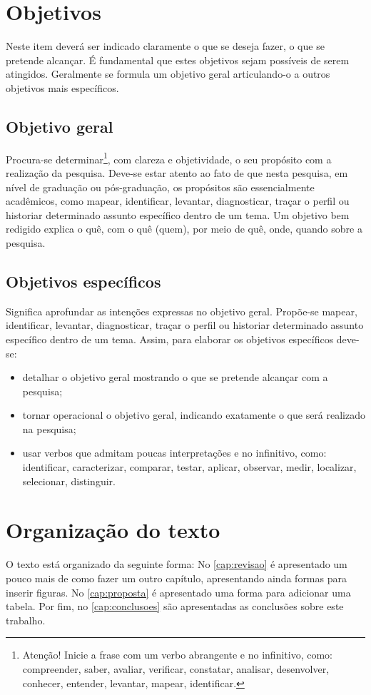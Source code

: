 \section{Objetivos}

Neste item deverá ser indicado claramente o que se deseja fazer, o que se pretende alcançar. É fundamental que estes objetivos sejam possíveis de serem atingidos. Geralmente se formula um objetivo geral articulando-o a outros objetivos mais específicos.

\subsection{Objetivo geral}

Procura-se determinar\footnote{Atenção! Inicie a frase com um verbo abrangente e no infinitivo, como: compreender, saber, avaliar, verificar, constatar, analisar, desenvolver, conhecer, entender, levantar, mapear, identificar.}, com clareza e objetividade, o seu propósito com a realização da pesquisa. Deve-se estar atento ao fato de que nesta pesquisa, em nível de graduação ou pós-graduação, os propósitos são essencialmente acadêmicos, como mapear, identificar, levantar, diagnosticar, traçar o perfil ou historiar determinado assunto específico dentro de um tema. Um objetivo bem redigido explica o quê, com o quê (quem), por meio de quê, onde, quando sobre a pesquisa.

\subsection{Objetivos específicos}

Significa aprofundar as intenções expressas no objetivo geral. Propõe-se mapear, identificar, levantar, diagnosticar, traçar o perfil ou historiar determinado assunto específico dentro de um tema. Assim, para elaborar os objetivos específicos deve-se:

\begin{itemize}
   \item detalhar o objetivo geral mostrando o que se pretende alcançar com a pesquisa;
   \item tornar operacional o objetivo geral, indicando exatamente o que será realizado na pesquisa;
   \item usar verbos que admitam poucas interpretações e no infinitivo, como: identificar, caracterizar, comparar, testar, aplicar, observar, medir, localizar, selecionar, distinguir.
\end{itemize}


\section{Organização do texto}

O texto está organizado da seguinte forma: No \autoref{cap:revisao} é apresentado um pouco mais de como fazer um outro capítulo, apresentando ainda formas para inserir figuras. No \autoref{cap:proposta} é apresentado uma forma para adicionar uma tabela. Por fim, no \autoref{cap:conclusoes} são apresentadas as conclusões sobre este trabalho.